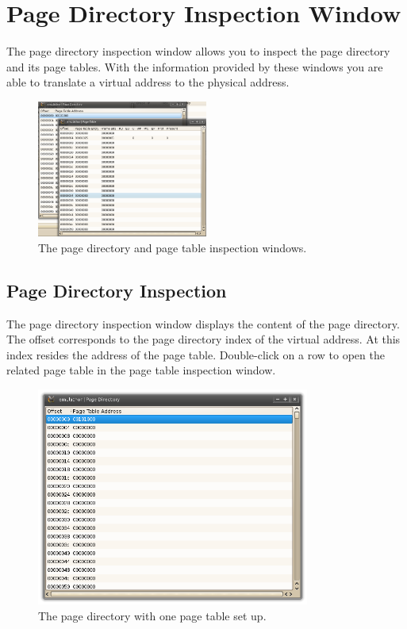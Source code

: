\section{Page Directory Inspection Window}
The page directory inspection window allows you to inspect the page directory and its page tables. With the information provided by these windows you are able to translate a virtual address to the physical address.
\begin{figure}[H]
\begin{center}
	\includegraphics[width=0.5\textwidth]{./files/emu_gui_mmu.png}
\end{center}
	\caption{The page directory and page table inspection windows.}
\end{figure}

\subsection{Page Directory Inspection}
The page directory inspection window displays the content of the page directory. The offset corresponds to the page directory index of the virtual address. At this index resides the address of the page table. Double-click on a row to open the related page table in the page table inspection window.
\begin{figure}[H]
\begin{center}
	\includegraphics[width=0.8\textwidth]{./files/emu_gui_mmu_pagedir.png}
\end{center}
	\caption{The page directory with one page table set up.}
\end{figure}

